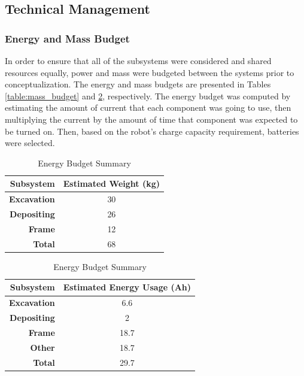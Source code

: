 \documentclass[class=article, crop=false]{standalone}
\begin{document}
	\subsection{Technical Management}
	\label{subsec:technical_management}
	
	\subsubsection{Energy and Mass Budget}
	In order to ensure that all of the subsystems were considered and shared resources equally, power and mass were budgeted between the systems prior to conceptualization. The energy and mass budgets are presented in Tables \ref{table:mass_budget} and \ref{table:energy_budget}, respectively. The energy budget was computed by estimating the amount of current that each component was going to use, then multiplying the current by the amount of time that component was expected to be turned on. Then, based on the robot's charge capacity requirement, batteries were selected.
	
\FloatBarrier
	\begin{table}[h]
	\scriptsize
	\parbox{.45\linewidth}{
	\centering
	\begin{tabular}{ | r | c | }
 	\hline		
 	\rowcolor[gray]{0.8}
 		\textbf{Subsystem} & \textbf{Estimated Weight (kg)} \\
 		\hline\hline
 		\textbf{Excavation} & 30 \\
 		\hline
 		\textbf{Depositing} & 26 \\
 		\hline
 		\textbf{Frame} & 12 \\
 		\hline
 		\textbf{Total} & 68 \\
 		\hline
	\end{tabular}
	\caption{Mass Budget Summary}
		\label{table:mass_budget}
	}
	\hfill
	\parbox{.45\linewidth}{
	\centering
	\begin{tabular}{ | r | c | }
 	\hline		
 	\rowcolor[gray]{0.8}
 		\textbf{Subsystem} & \textbf{Estimated Energy Usage (Ah)} \\
 		\hline\hline
 		\textbf{Excavation} & 6.6 \\
 		\hline
 		\textbf{Depositing} & 2 \\
 		\hline
 		\textbf{Frame} & 18.7 \\
 		\hline
 		\textbf{Other} & 18.7 \\
 		\hline
 		\textbf{Total} & 29.7 \\
 		\hline
	\end{tabular}
	\caption{Energy Budget Summary}
		\label{table:energy_budget}
	}
	\end{table}
	\FloatBarrier
	
\end{document}
